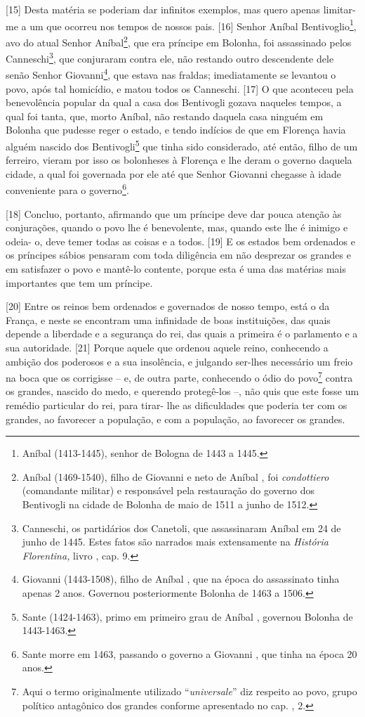 {[}15{]} Desta
matéria se poderiam dar infinitos exemplos, mas quero apenas limitar-me
a um que ocorreu nos tempos de nossos pais. {[}16{]} Senhor Aníbal
Bentivoglio\footnote{Aníbal  (1413-1445), senhor de Bologna de 1443 a
  1445.}, avo do atual Senhor Aníbal\footnote{Aníbal  (1469-1540),
  filho de Giovanni  e neto de Aníbal , foi \emph{condottiero}
  (comandante militar) e responsável pela restauração do governo dos
  Bentivogli na cidade de Bolonha de maio de 1511 a junho de 1512.}, que
era príncipe em Bolonha, foi assassinado pelos Canneschi\footnote{Canneschi,
  os partidários dos Canetoli, que assassinaram Aníbal  em 24 de junho
  de 1445. Estes fatos são narrados mais extensamente na \emph{História
  Florentina,} livro , cap. 9.}, que conjuraram contra ele, não
restando outro descendente dele senão Senhor Giovanni\footnote{Giovanni
   (1443-1508), filho de Aníbal , que na época do assassinato tinha
  apenas 2 anos. Governou posteriormente Bolonha de 1463 a 1506.}, que
estava nas fraldas; imediatamente se levantou o povo, após tal
homicídio, e matou todos os Canneschi. {[}17{]} O que aconteceu pela
benevolência popular da qual a casa dos Bentivogli gozava naqueles
tempos, a qual foi tanta, que, morto Aníbal, não restando daquela casa
ninguém em Bolonha que pudesse reger o estado, e tendo indícios de que
em Florença havia alguém nascido dos Bentivogli\footnote{Sante
  (1424-1463), primo em primeiro grau de Aníbal , governou Bolonha de
  1443-1463.} que tinha sido considerado, até então, filho de um
ferreiro, vieram por isso os bolonheses à Florença e lhe deram o governo
daquela cidade, a qual foi governada por ele até que Senhor Giovanni
chegasse à idade conveniente para o governo\footnote{Sante morre em
  1463, passando o governo a Giovanni , que tinha na época 20 anos.}.

{[}18{]} Concluo, portanto, afirmando que um príncipe deve dar pouca
atenção às conjurações, quando o povo lhe é benevolente, mas, quando
este lhe é inimigo e odeia- o, deve temer todas as coisas e a todos.
{[}19{]} E os estados bem ordenados e os príncipes sábios pensaram com
toda diligência em não desprezar os grandes e em satisfazer o povo e
mantê-lo contente, porque esta é uma das matérias mais importantes que
tem um príncipe.

{[}20{]} Entre os reinos bem ordenados e governados de nosso tempo, está
o da França, e neste se encontram uma infinidade de boas instituições,
das quais depende a liberdade e a segurança do rei, das quais a primeira
é o parlamento e a sua autoridade. {[}21{]} Porque aquele que ordenou
aquele reino, conhecendo a ambição dos poderosos e a sua insolência, e
julgando ser-lhes necessário um freio na boca que os corrigisse -- e, de
outra parte, conhecendo o ódio do povo\footnote{Aqui o termo
  originalmente utilizado ``\emph{universale}'' diz respeito ao povo,
  grupo político antagônico dos grandes conforme apresentado no cap. ,
  2.} contra os grandes, nascido do medo, e querendo protegê-los --, não
quis que este fosse um remédio particular do rei, para tirar- lhe as
dificuldades que poderia ter com os grandes, ao favorecer a população, e
com a população, ao favorecer os grandes.

